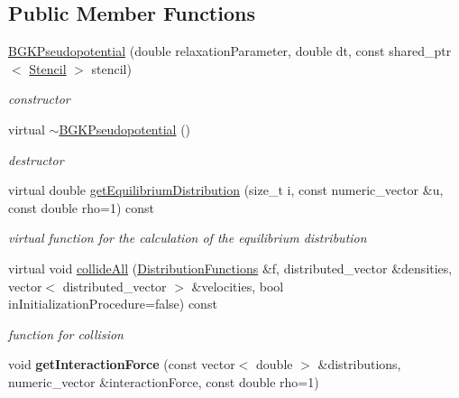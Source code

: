 \subsection*{Public Member Functions}
\begin{DoxyCompactItemize}
\item 
\hypertarget{classnatrium_1_1BGKPseudopotential_a47344e97049c04a1e28a43474d5b04ca}{
\hyperlink{classnatrium_1_1BGKPseudopotential_a47344e97049c04a1e28a43474d5b04ca}{BGKPseudopotential} (double relaxationParameter, double dt, const shared\_\-ptr$<$ \hyperlink{classnatrium_1_1Stencil}{Stencil} $>$ stencil)}
\label{classnatrium_1_1BGKPseudopotential_a47344e97049c04a1e28a43474d5b04ca}

\begin{DoxyCompactList}\small\item\em constructor \item\end{DoxyCompactList}\item 
\hypertarget{classnatrium_1_1BGKPseudopotential_ac60f2eeed9c101141b29dd0cbee40932}{
virtual \hyperlink{classnatrium_1_1BGKPseudopotential_ac60f2eeed9c101141b29dd0cbee40932}{$\sim$BGKPseudopotential} ()}
\label{classnatrium_1_1BGKPseudopotential_ac60f2eeed9c101141b29dd0cbee40932}

\begin{DoxyCompactList}\small\item\em destructor \item\end{DoxyCompactList}\item 
virtual double \hyperlink{classnatrium_1_1BGKPseudopotential_a63ce98e44a07466963fb123cac9dd905}{getEquilibriumDistribution} (size\_\-t i, const numeric\_\-vector \&u, const double rho=1) const 
\begin{DoxyCompactList}\small\item\em virtual function for the calculation of the equilibrium distribution \item\end{DoxyCompactList}\item 
virtual void \hyperlink{classnatrium_1_1BGKPseudopotential_ac52de8933fa8fbd8a8aa2a3a978f0f4b}{collideAll} (\hyperlink{classnatrium_1_1DistributionFunctions}{DistributionFunctions} \&f, distributed\_\-vector \&densities, vector$<$ distributed\_\-vector $>$ \&velocities, bool inInitializationProcedure=false) const 
\begin{DoxyCompactList}\small\item\em function for collision \item\end{DoxyCompactList}\item 
\hypertarget{classnatrium_1_1BGKPseudopotential_a7129a321a07b85ac6245d71190eeeedd}{
void {\bfseries getInteractionForce} (const vector$<$ double $>$ \&distributions, numeric\_\-vector \&interactionForce, const double rho=1)}
\label{classnatrium_1_1BGKPseudopotential_a7129a321a07b85ac6245d71190eeeedd}


\end{DoxyCompactItemize}
